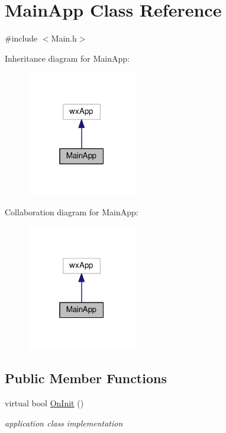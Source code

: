 \hypertarget{classMainApp}{}\section{Main\+App Class Reference}
\label{classMainApp}


{\ttfamily \#include $<$Main.\+h$>$}



Inheritance diagram for Main\+App\+:\nopagebreak
\begin{figure}[H]
\begin{center}
\leavevmode
\includegraphics[width=135pt]{classMainApp__inherit__graph}
\end{center}
\end{figure}


Collaboration diagram for Main\+App\+:\nopagebreak
\begin{figure}[H]
\begin{center}
\leavevmode
\includegraphics[width=135pt]{classMainApp__coll__graph}
\end{center}
\end{figure}
\subsection*{Public Member Functions}
\begin{DoxyCompactItemize}
\item 
virtual bool \hyperlink{classMainApp_aff3d398e1b61f1016c37d57798f86731}{On\+Init} ()
\begin{DoxyCompactList}\small\item\em application class implementation \end{DoxyCompactList}\end{DoxyCompactItemize}


